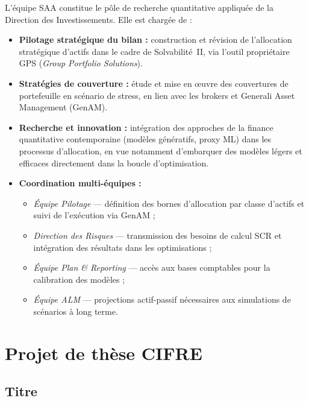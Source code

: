 \documentclass[10pt,a4paper]{article}
\begin{document}
L'équipe SAA constitue le pôle de recherche quantitative appliquée de la
Direction des Investissements.  Elle est chargée de :

\begin{itemize}[leftmargin=1.6em,itemsep=1pt]
  \item \textbf{Pilotage stratégique du bilan :} construction et révision de
        l'allocation stratégique d'actifs dans le cadre de Solvabilité~II, via
        l'outil propriétaire GPS (\textit{Group Portfolio Solutions}).
  \item \textbf{Stratégies de couverture :} étude et mise en \oe{}uvre des
        couvertures de portefeuille en scénario de stress, en lien avec les
        brokers et Generali Asset Management (GenAM).
  \item \textbf{Recherche et innovation :} intégration des approches de la
        finance quantitative contemporaine (modèles génératifs, proxy ML)
        dans les processus d'allocation, en vue notamment d'embarquer des
        modèles légers et efficaces directement dans la boucle d'optimisation.
  \item \textbf{Coordination multi-équipes :}
  \begin{itemize}[leftmargin=1.4em,itemsep=0pt]
    \item \textit{Équipe Pilotage} --- définition des bornes d'allocation par
          classe d'actifs et suivi de l'exécution via GenAM ;
    \item \textit{Direction des Risques} --- transmission des besoins de calcul
          SCR et intégration des résultats dans les optimisations ;
    \item \textit{Équipe Plan \& Reporting} --- accès aux bases comptables pour
          la calibration des modèles ;
    \item \textit{Équipe ALM} --- projections actif-passif nécessaires aux
          simulations de scénarios à long terme.
  \end{itemize}
\end{itemize}

\section{Projet de thèse CIFRE}

\subsection{Titre}
\end{document}
